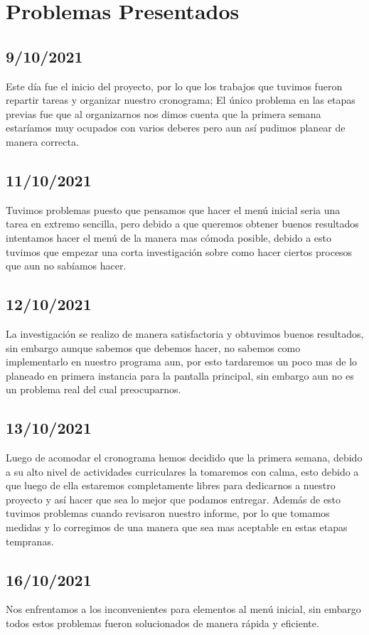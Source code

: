\documentclass{article}
\begin{document}
\section{Problemas Presentados}
    \subsection{9/10/2021}
    Este día fue el inicio del proyecto, por lo que los trabajos que tuvimos fueron repartir tareas y organizar nuestro cronograma; El único problema en las etapas previas fue que al organizarnos nos dimos cuenta que la primera semana estaríamos muy ocupados con varios deberes pero aun así pudimos planear de manera correcta.

    \subsection{11/10/2021}
    Tuvimos problemas puesto que pensamos que hacer el menú inicial seria una tarea en extremo sencilla, pero debido a que queremos obtener buenos resultados intentamos hacer el menú de la manera mas cómoda posible, debido a esto tuvimos que empezar una corta investigación sobre como hacer ciertos procesos que aun no sabíamos hacer.
    
    \subsection{12/10/2021}
    La investigación se realizo de manera satisfactoria y obtuvimos buenos resultados, sin embargo aunque sabemos que debemos hacer, no sabemos como implementarlo en nuestro programa aun, por esto tardaremos un poco mas de lo planeado en primera instancia para la pantalla principal, sin embargo aun no es un problema real del cual preocuparnos.
    
    \subsection{13/10/2021}
    Luego de acomodar el cronograma hemos decidido que la primera semana, debido a su alto nivel de actividades curriculares la tomaremos con calma, esto debido a que luego de ella estaremos completamente libres para dedicarnos a nuestro proyecto y así hacer que sea lo mejor que podamos entregar. Además de esto tuvimos problemas cuando revisaron nuestro informe, por lo que tomamos medidas y lo corregimos de una manera que sea mas aceptable en estas etapas tempranas.
    
    \subsection{16/10/2021}
    Nos enfrentamos a los inconvenientes para elementos al menú inicial, sin embargo todos estos problemas fueron solucionados de manera rápida y eficiente.   
     
\end{document}
